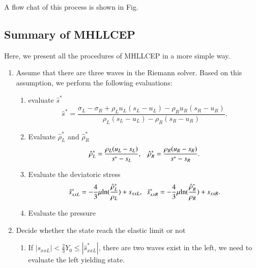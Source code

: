 \documentclass[review]{elsarticle}
\begin{document}
A flow chat of this process is shown in Fig.


\subsection{Summary of MHLLCEP}
Here, we present all the procedures of MHLLCEP in a more simple way.
\begin{enumerate}
  \item  Assume  that there are three  waves in the Riemann solver. Based on this assumption, we perform the following evaluations:
  \begin{enumerate}
    \item evaluate  $\hat{s}^*$
    \begin{equation*}
       \hat{s}^* = \frac{\sigma_L-\sigma_R+\rho_L u_L(s_L-u_L)-\rho_R u_R(s_R-u_R)}{\rho_L(s_L-u_L)-\rho_R(s_R-u_R)}.
   \end{equation*}
    \item Evaluate  $\hat{\rho}_L^*$ and $\hat{\rho}_R^*$
    \begin{equation*}
       \hat{\rho}_L^* = \frac{\rho_L(u_L-s_L)}{s^*-s_L}, \hspace{0.3cm}  \hat{\rho}_R^* = \frac{\rho_R(u_R-s_R)}{s^*-s_R}.
    \end{equation*}
    \item Evaluate  the deviatoric stress
       \begin{equation*}
        \hat{s}_{xxL}^*=-\frac{4}{3}\mu\text{ln}(\frac{\hat{\rho}_L^*}{\rho_L})+s_{xxL},\hspace{0.2cm}  \hat{s}_{xxR}^*=-\frac{4}{3}\mu\text{ln}(\frac{\hat{\rho}_R^*}{\rho_R})+s_{xxR}.
      \end{equation*}
    \item Evaluate the pressure
  \end{enumerate}
  \item Decide whether the state reach the elastic limit or not
        \begin{enumerate}
          \item If $|s_{xxL}| < \frac{2}{3}Y_0 \le |\hat{s}_{xxL}^*| $, there are two waves exist in the left, we need to  evaluate the left yielding state.


\end{enumerate}
\end{enumerate}
\end{document}
